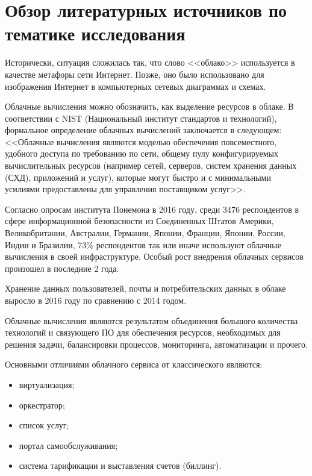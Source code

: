 \section{Обзор литературных источников по тематике исследования} \label{literature}

Исторически, ситуация сложилась так, что слово <<облако>> используется в качестве метафоры сети Интернет.
Позже, оно было использовано для изображения Интернет в компьютерных сетевых диаграммах и схемах.

Облачные вычисления можно обозначить, как выделение ресурсов в облаке.
В соответствии с NIST (Национальный институт стандартов и технологий), формальное определение облачных вычислений заключается в следующем:
<<Облачные вычисления являются моделью обеспечения повсеместного, удобного доступа по требованию по сети, общему пулу конфигурируемых вычислительных ресурсов (например сетей, серверов, систем хранения данных (СХД), приложений и услуг), которые могут быстро и с минимальными усилиями предоставлены для управления поставщиком услуг>>. \cite{nist}

Согласно опросам института Понемона в 2016 году, среди 3476 респондентов в сфере информационной безопасности из Соединенных Штатов Америки, Великобритании, Австралии, Германии, Японии, Франции, Японии, России, Индии и Бразилии, 73\% респондентов так или иначе используют облачные вычисления в своей инфраструктуре.
Особый рост внедрения облачных сервисов произошел в последние 2 года. \cite{gemalto}

Хранение данных пользователей, почты и потребительских данных в облаке выросло в 2016 году по сравнению с 2014 годом.


Облачные вычисления являются результатом объединения большого количества технологий и связующего ПО для обеспечения ресурсов, необходимых для решения задачи, балансировки процессов, мониторинга, автоматизации и прочего.

Основными отличиями облачного сервиса от классического являются:
\begin{itemize}
  \item виртуализация;
  \item оркестратор;
  \item список услуг;
  \item портал самообслуживания;
  \item система тарификации и выставления счетов (биллинг).
\end{itemize}


